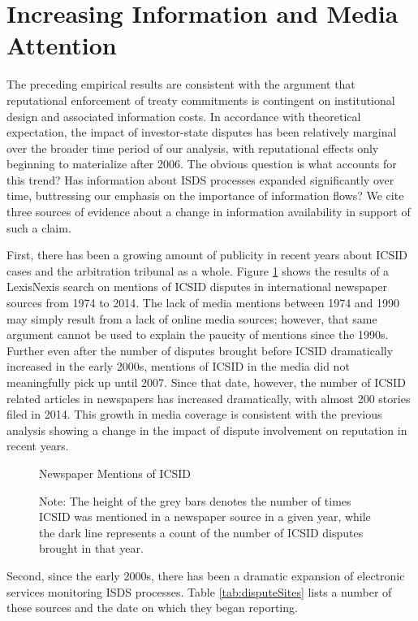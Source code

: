 \documentclass[12pt,onesided]{amsart}
\begin{document}
\section*{Increasing Information and Media Attention}

The preceding empirical results are consistent with the argument that reputational enforcement of treaty commitments is contingent on institutional design and associated information costs. In accordance with theoretical expectation, the impact of investor-state disputes has been relatively marginal over the broader time period of our analysis, with reputational effects only beginning to materialize after 2006. The obvious question is what accounts for this trend? Has information about ISDS processes expanded significantly over time, buttressing our emphasis on the importance of information flows? We cite three sources of evidence about a change in information availability in support of such a claim. 

First, there has been a growing amount of publicity in recent years about ICSID cases and the arbitration tribunal as a whole. Figure \ref{fig:icsidMedia} shows the results of a LexisNexis search on mentions of ICSID disputes in international newspaper sources from 1974 to 2014. The lack of media mentions between 1974 and 1990 may simply result from a lack of online media sources; however, that same argument cannot be used to explain the paucity of mentions since the 1990s. Further even after the number of disputes brought before ICSID dramatically increased in the early 2000s, mentions of ICSID in the media did not meaningfully pick up until 2007. Since that date, however, the number of ICSID related articles in newspapers has increased dramatically, with almost 200 stories filed in 2014. This growth in media coverage is consistent with the previous analysis showing a change in the impact of dispute involvement on reputation in recent years.

\begin{figure}[ht]
	\centering
	\caption{Newspaper Mentions of ICSID}
	\label{fig:icsidMedia}
	\resizebox{.8\textwidth}{!}{}
	\caption*{Note: The height of the grey bars denotes the number of times ICSID was mentioned in a newspaper source in a given year, while the dark line represents a count of the number of ICSID disputes brought in that year.}
\end{figure}
\FloatBarrier

Second, since the early 2000s, there has been a dramatic expansion of electronic services monitoring ISDS processes. Table \ref{tab:disputeSites} lists a number of these sources and the date on which they began reporting. 
\end{document}
